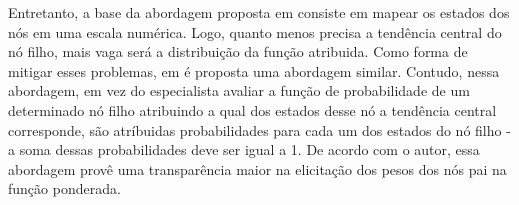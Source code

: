 Entretanto, a base da abordagem proposta em \cite{fenton} consiste em mapear os estados dos nós em uma escala numérica. Logo, quanto menos precisa a tendência central do nó filho, mais vaga será a distribuição da função atribuida. Como forma de mitigar esses problemas, em \cite{laitila} é proposta uma abordagem similar. Contudo, nessa abordagem, em vez do especialista avaliar a função de probabilidade de um determinado nó filho atribuindo a qual dos estados desse nó a tendência central corresponde, são atríbuidas probabilidades para cada um dos estados do nó filho - a soma dessas probabilidades deve ser igual a 1. De acordo com o autor, essa abordagem provê uma transparência maior na elicitação dos pesos dos nós pai na função ponderada.
